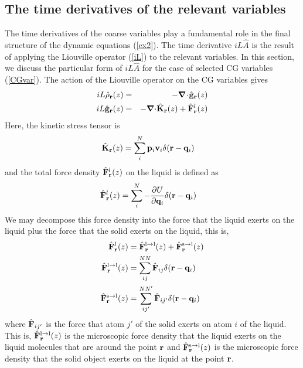 \documentclass[a4paper,openright,12pt]{book}
\newcommand{\esc}{\!\cdot\!}
\begin{document}
\subsection{The time derivatives of the relevant variables}
The time derivatives  of the coarse variables play  a fundamental role
in the final structure of  the dynamic equations (\ref{ex2}). The time
derivative $  iL\hat{A}$ is  the result of  applying the  Liouville operator
(\ref{iL}) to the relevant variables.  In this section, we discuss the
particular  form of  $  iL\hat{A}$ for  the case  of  selected CG  variables
(\ref{CGvar}). The action of the Liouville operator on the CG variables gives \cite{Espanol2015a}
\begin{eqnarray}
  iL \hat{\rho}_{\bf r}(z) &=& -\boldsymbol{\nabla}\esc\hat{\bf g}_{\bf r}(z)
\nonumber\\
iL  \hat{\bf g}_{\bf r}(z) &=& -\boldsymbol{\nabla}{\cdot} \hat{{\bf K}}_{\bf r}(z)+
\hat{\bf F}^l_{\bf r}(z)
\label{ildens}
\end{eqnarray}
Here, the kinetic stress tensor is 
\begin{align}
  \hat{{\bf K}}_{\bf r}(z) &=\sum^{N}_i{\bf p}_i{\bf v}_i
\delta({\bf r}-{\bf q}_i)
\end{align}
and the total force density $\hat{\bf F}^l_{\bf r}(z)$  on the liquid
is defined as
\begin{align}
  \hat{\bf F}^l_{\bf r}(z) &
=\sum_i^N-\frac{\partial U}{\partial {\bf q}_i}\delta({\bf r}-{\bf q}_i)
\label{Frtot}
\end{align}
We may decompose  this force density into the
force that  the liquid exerts on  the liquid plus the  force that the
solid   exerts  on  the   liquid,  this   is,  
\begin{align}
   \hat{\bf  F}^l_{\bf
  r}(z)&=\hat{\bf  F}^{\rm l\to  l}_{\bf r}(z)  +\hat{\bf  F}^{\rm s\to
  l}_{\bf r}(z) 
\nonumber\\
\hat{\bf F}^{\rm l\to l}_{\bf r}(z) &= \sum^{NN}_{ij}\hat{\bf F}_{ij}\delta({\bf r}-{\bf q}_i)
\nonumber\\
\hat{\bf F}^{\rm s\to l}_{\bf r}(z) &= \sum^{NN'}_{ij'}\hat{\bf F}_{ij'}\delta({\bf r}-{\bf q}_i)
\label{Fr}
\end{align}
where $\hat{\bf F}_{ij'}$ is the force  that atom $j'$ of the solid
exerts on  atom $i$ of  the liquid.   This is, $\hat{\bf  F}^{\rm l\to
  l}_{\bf r}(z)  $ is  the microscopic force  density that  the liquid
exerts on the liquid molecules that are around the point ${\bf r}$ and
$\hat{\bf F}^{\rm s\to l}_{\bf r}(z)$ is the microscopic force density
that the solid object exerts on the liquid at the point ${\bf r}$.
\end{document}
